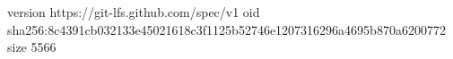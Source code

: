version https://git-lfs.github.com/spec/v1
oid sha256:8c4391cb032133e45021618c3f1125b52746e1207316296a4695b870a6200772
size 5566
